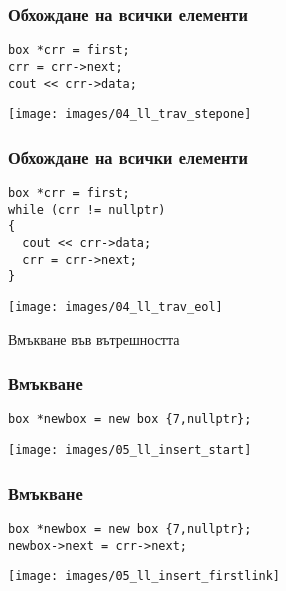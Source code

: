 \documentclass{beamer}
\begin{document}
\begin{frame}[fragile]
\frametitle{Обхождане на всички елементи}

\begin{flushleft}
\begin{lstlisting}
box *crr = first;
crr = crr->next;
cout << crr->data;
\end{lstlisting}  
\end{flushleft}


\texttt{[image: images/04\_ll\_trav\_stepone]}

\end{frame}

\begin{frame}[fragile]
\frametitle{Обхождане на всички елементи}

\begin{flushleft}
\begin{lstlisting}
box *crr = first;
while (crr != nullptr)
{
  cout << crr->data;
  crr = crr->next;
}
\end{lstlisting}  
\end{flushleft}


\texttt{[image: images/04\_ll\_trav\_eol]}

\end{frame}


\begin{frame}
\centerline{Вмъкване във вътрешността}
\end{frame}



\begin{frame}[fragile]
\frametitle{Вмъкване}

\begin{flushleft}
\begin{lstlisting}
box *newbox = new box {7,nullptr};
\end{lstlisting}  
\end{flushleft}


\texttt{[image: images/05\_ll\_insert\_start]}

\end{frame}

\begin{frame}[fragile]
\frametitle{Вмъкване}

\begin{flushleft}
\begin{lstlisting}
box *newbox = new box {7,nullptr};
newbox->next = crr->next;
\end{lstlisting}  
\end{flushleft}


\texttt{[image: images/05\_ll\_insert\_firstlink]}

\end{frame}
\end{document}

